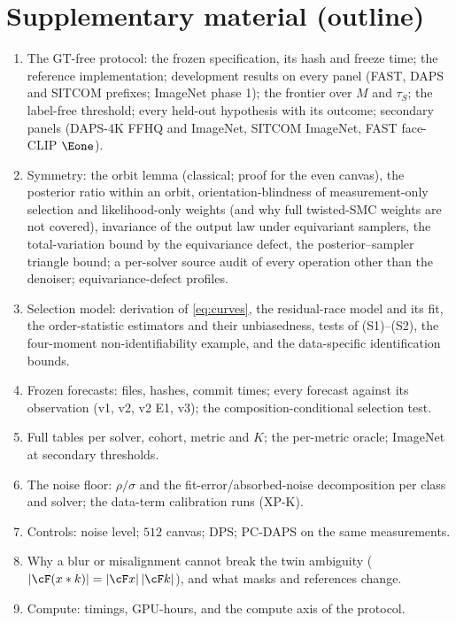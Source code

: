 \section*{Supplementary material (outline)}
\begin{enumerate}[label=S\arabic*.]
\item The GT-free protocol: the frozen specification, its hash and freeze time; the reference implementation; development results on every panel (FAST, DAPS and SITCOM prefixes; ImageNet phase 1); the frontier over $M$ and $\tau_S$; the label-free threshold; every held-out hypothesis with its outcome; secondary panels (DAPS-4K FFHQ and ImageNet, SITCOM ImageNet, FAST face-CLIP $\Eone$). 
\item Symmetry: the orbit lemma (classical; proof for the even canvas), the posterior ratio within an orbit, orientation-blindness of measurement-only selection and likelihood-only weights (and why full twisted-SMC weights are not covered), invariance of the output law under equivariant samplers, the total-variation bound by the equivariance defect, the posterior--sampler triangle bound; a per-solver source audit of every operation other than the denoiser; equivariance-defect profiles.
\item Selection model: derivation of \cref{eq:curves}, the residual-race model and its fit, the order-statistic estimators and their unbiasedness, tests of (S1)--(S2), the four-moment non-identifiability example, and the data-specific identification bounds.
\item Frozen forecasts: files, hashes, commit times; every forecast against its observation (v1, v2, v2 E1, v3); the composition-conditional selection test.
\item Full tables per solver, cohort, metric and $K$; the per-metric oracle; ImageNet at secondary thresholds.
\item The noise floor: $\rho/\sigma$ and the fit-error/absorbed-noise decomposition per class and solver; the data-term calibration runs (XP-K).
\item Controls: noise level; $512$ canvas; DPS; PC-DAPS on the same measurements.
\item Why a blur or misalignment cannot break the twin ambiguity ($|\cF(x*k)|=|\cF x|\,|\cF k|$), and what masks and references change.
\item Compute: timings, GPU-hours, and the compute axis of the protocol.
\end{enumerate}

